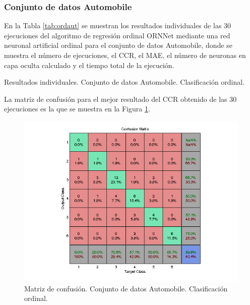 			\subsubsection{Conjunto de datos Automobile}
			
			En la Tabla \ref{tab:ordaut} se muestran los resultados individuales de las 30 ejecuciones del algoritmo de regresión ordinal ORNNet mediante una red neuronal artificial ordinal para el conjunto de datos Automobile, donde se muestra el número de ejecuciones, el CCR, el MAE, el número de neuronas en capa oculta calculado y el tiempo total de la ejecución.\\
			
			\begin{table}[!htbp]
				\centering
				\caption{Resultados individuales. Conjunto de datos Automobile. Clasificación ordinal.}
				\label{tab:ordaut}
			\end{table}
			
			La matriz de confusión para el mejor resultado del CCR obtenido de las 30 ejecuciones es la que se muestra en la Figura \ref{fig:ordaut}.
			
			\begin{figure}[htbp]
				\centering
				\includegraphics[scale=0.8]{../src/results/ordinal/automobile_mc1.png}
				\caption{Matriz de confusión. Conjunto de datos Automobile. Clasificación ordinal.}
				\label{fig:ordaut}
			\end{figure}
			
